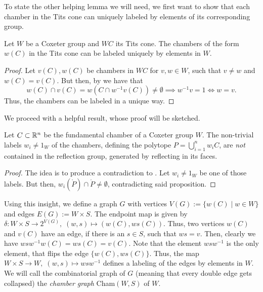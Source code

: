 To state the other helping lemma we will need, we first want to show that each chamber in the Tits cone can uniquely labeled by elements of its corresponding group.

\begin{lemma}
    Let \(W\) be a Coxeter group and \(WC\) its Tits cone.
    The chambers of the form \(w(C)\) in the Tits cone can be labeled uniquely by elements in \(W\).
\end{lemma}
\begin{proof}
    Let \(v(C), w(C)\) be chambers in \(WC\) for \(v, w \in W\), such that \(v \neq w\) and \(w(C) = v(C)\).\newline
    But then, by  we have that
    \[w(C) \cap v(C) = w(C \cap w^{-1}v(C)) \neq \emptyset \implies w^{-1}v = 1 \iff w = v.\]
    Thus, the chambers can be labeled in a unique way.
\end{proof}

We proceed with a helpful result, whose proof will be sketched.

\begin{lemma}
    Let \(C \subset \mathbb{R}^n\) be the fundamental chamber of a Coxeter group \(W\).
    The non-trivial labels \(w_i \neq 1_W\) of the chambers, defining the polytope \(P = \bigcup_{i=1}^n w_i C\), are \emph{not} contained in the reflection group, generated by reflecting in its faces.
\end{lemma}
\begin{proof}
    The idea is to produce a contradiction to . \newline
    Let \(w_i \neq 1_W\) be one of those labels.
    But then, \(w_i(\mathring{P}) \cap \mathring{P} \neq \emptyset\), contradicting said proposition.
\end{proof}

Using this insight, we define a graph \(G\) with vertices \(V(G) := \{w(C) \;\vert\; w \in W\}\) and edges \(E(G) := W \times S\).
The endpoint map is given by \(\delta : W \times S \to 2^{V(G)},\; (w, s) \mapsto (w(C), ws(C))\).
Thus, two vertices \(w(C)\) and \(v(C)\) have an edge, if there is an \(s \in S\), such that \(ws = v\).
Then, clearly we have \(wsw^{-1}w(C) = ws(C) = v(C)\).
Note that the element \(wsw^{-1}\) is the only element, that flips the edge \(\{w(C), ws(C)\}\).
Thus, the map \(W \times S \to W, \; (w, s) \mapsto wsw^{-1}\) defines a labeling of the edges by elements in \(W\).
We will call the combinatorial graph of \(G\) (meaning that every double edge gets collapsed) the \emph{chamber graph} Cham\((W, S)\) of \(W\).

